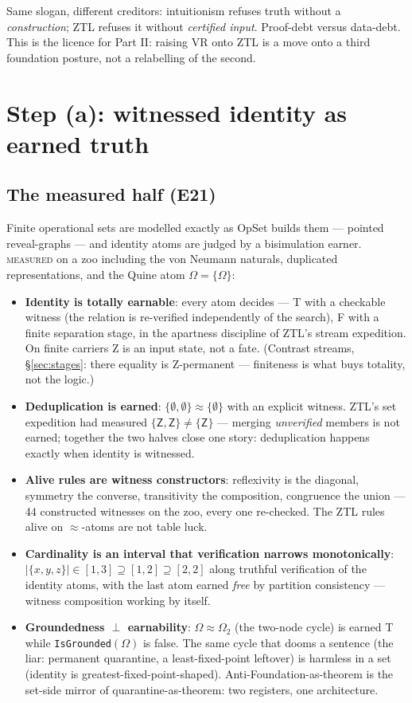\documentclass[11pt]{article}
\theoremstyle{remark}
\newcommand{\OpSet}{\textsf{OpSet}}
\newcommand{\eq}{\approx}
\newcommand{\vT}{\textsf{T}}
\newcommand{\vF}{\textsf{F}}
\newcommand{\vZ}{\textsf{Z}}
\newcommand{\MEASURED}{\textsc{measured}}
\begin{document}
Same slogan, different creditors: intuitionism refuses truth without a
\emph{construction}; ZTL refuses it without \emph{certified input}.
Proof-debt versus data-debt. This is the licence for Part II: raising VR
onto ZTL is a move onto a third foundation posture, not a relabelling of
the second.

\section{Step (a): witnessed identity as earned truth}
\label{sec:atoms}

\subsection{The measured half (E21)}

Finite operational sets are modelled exactly as \OpSet{} builds them ---
pointed reveal-graphs --- and identity atoms are judged by a bisimulation
earner. \MEASURED{} on a zoo including the von Neumann naturals, duplicated
representations, and the Quine atom $\Omega = \{\Omega\}$:

\begin{itemize}
\item \textbf{Identity is totally earnable}: every atom decides --- \vT{}
with a checkable witness (the relation is re-verified independently of the
search), \vF{} with a finite separation stage, in the apartness discipline
of ZTL's stream expedition. On finite carriers \vZ{} is an input state, not
a fate. (Contrast streams, \S\ref{sec:stages}: there equality is
\vZ-permanent --- finiteness is what buys totality, not the logic.)
\item \textbf{Deduplication is earned}: $\{\emptyset,\emptyset\} \eq
\{\emptyset\}$ with an explicit witness. ZTL's set expedition had measured
$\{\vZ,\vZ\} \neq \{\vZ\}$ --- merging \emph{unverified} members is not
earned; together the two halves close one story: deduplication happens
exactly when identity is witnessed.
\item \textbf{Alive rules are witness constructors}: reflexivity is the
diagonal, symmetry the converse, transitivity the composition, congruence
the union --- 44 constructed witnesses on the zoo, every one re-checked.
The ZTL rules alive on $\eq$-atoms are not table luck.
\item \textbf{Cardinality is an interval that verification narrows
monotonically}: $|\{x,y,z\}| \in [1,3] \supseteq [1,2] \supseteq [2,2]$
along truthful verification of the identity atoms, with the last atom earned
\emph{free} by partition consistency --- witness composition working by
itself.
\item \textbf{Groundedness $\perp$ earnability}: $\Omega \eq \Omega_2$ (the
two-node cycle) is earned \vT{} while \texttt{IsGrounded}$(\Omega)$ is
false. The same cycle that dooms a sentence (the liar: permanent quarantine,
a least-fixed-point leftover) is harmless in a set (identity is
greatest-fixed-point-shaped). Anti-Foundation-as-theorem is the set-side
mirror of quarantine-as-theorem: two registers, one architecture.
\end{itemize}
\end{document}
